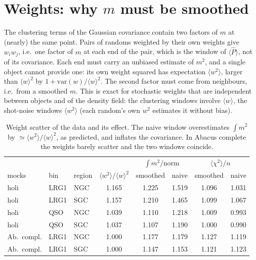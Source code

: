 \documentclass[11pt]{article}
\begin{document}
\section{Weights: why $m$ must be smoothed}
\label{sec:weights}

The clustering terms of the Gaussian covariance contain two factors of $m$ at (nearly) the same point. Pairs of randoms weighted by their own weights give $w_iw_j$, i.e.\ one factor of $m$ at each end of the pair, which is the window of $\langle\hat P\rangle$, not of its covariance. Each end must carry an unbiased estimate of $m^2$, and a single object cannot provide one: its own weight squared has expectation $\langle w^2\rangle$, larger than $\langle w\rangle^2$ by $1+\mathrm{var}(w)/\langle w\rangle^2$. The second factor must come from neighbours, i.e.\ from a smoothed $m$. This is exact for stochastic weights that are independent between objects and of the density field: the clustering windows involve $\langle w\rangle$, the shot-noise windows $\langle w^2\rangle$ (each random's own $w^2$ estimates it without bias).

\begin{table}[h]
\centering\small
\begin{tabular}{lll ccc cc}
\toprule
 & & & & \multicolumn{2}{c}{$\int m^2/\mathrm{norm}$} & \multicolumn{2}{c}{$\langle\chi^2\rangle/n$}\\
mocks & bin & region & $\langle w^2\rangle/\langle w\rangle^2$ & smoothed & naive & smoothed & naive\\
\midrule
holi & LRG1 & NGC & 1.165 & 1.225 & 1.519 & 1.096 & 1.031\\
holi & LRG1 & SGC & 1.157 & 1.210 & 1.465 & 1.099 & 1.067\\
holi & QSO & NGC & 1.039 & 1.110 & 1.218 & 1.009 & 0.993\\
holi & QSO & SGC & 1.037 & 1.107 & 1.190 & 1.000 & 0.990\\
Ab.\ compl. & LRG1 & NGC & 1.000 & 1.177 & 1.179 & 1.127 & 1.119\\
Ab.\ compl. & LRG1 & SGC & 1.000 & 1.147 & 1.153 & 1.121 & 1.123\\
\bottomrule
\end{tabular}
\caption{Weight scatter of the data and its effect. The naive window overestimates $\int m^2$ by $\simeq\langle w^2\rangle/\langle w\rangle^2$, as predicted, and inflates the covariance. In Abacus complete the weights barely scatter and the two windows coincide.}
\label{tab:weights}
\end{table}
\end{document}
